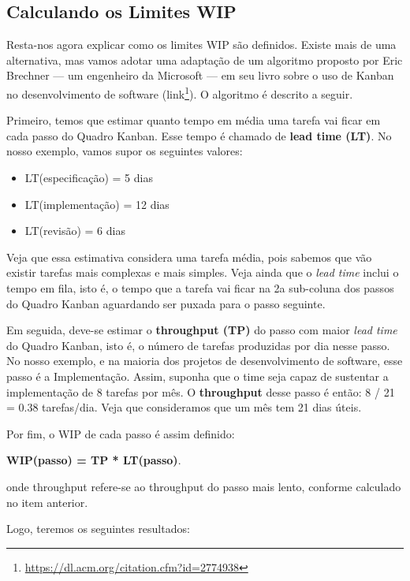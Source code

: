 \documentclass[
  11pt,
  twoside]{book}
\DeclareRobustCommand{\href}[2]{#2\footnote{\url{#1}}}
\begin{document}
\hypertarget{calculando-os-limites-wip}{%
\subsection{Calculando os Limites WIP}\label{calculando-os-limites-wip}}

  Resta-nos agora
explicar como os limites WIP são definidos. Existe mais de uma
alternativa, mas vamos adotar uma adaptação de um algoritmo proposto por
Eric Brechner --- um engenheiro da Microsoft --- em seu livro sobre o
uso de Kanban no desenvolvimento de software
(\href{https://dl.acm.org/citation.cfm?id=2774938}{link}). O algoritmo é
descrito a seguir.

Primeiro, temos que estimar quanto tempo em média uma tarefa vai ficar
em cada passo do Quadro Kanban. Esse tempo é chamado de \textbf{lead
time (LT)}. No nosso exemplo, vamos supor os seguintes valores:

\begin{itemize}
\item
  LT(especificação) = 5 dias
\item
  LT(implementação) = 12 dias
\item
  LT(revisão) = 6 dias
\end{itemize}

Veja que essa estimativa considera uma tarefa média, pois sabemos que
vão existir tarefas mais complexas e mais simples. Veja ainda que o
\emph{lead time} inclui o tempo em fila, isto é, o tempo que a tarefa
vai ficar na 2a sub-coluna dos passos do Quadro Kanban aguardando ser
puxada para o passo seguinte.

Em seguida, deve-se estimar o \textbf{throughput (TP)} do passo com
maior \emph{lead time} do Quadro Kanban, isto é, o número de tarefas
produzidas por dia nesse passo. No nosso exemplo, e na maioria dos
projetos de desenvolvimento de software, esse passo é a Implementação.
Assim, suponha que o time seja capaz de sustentar a implementação de 8
tarefas por mês. O \textbf{throughput} desse passo é então: 8 / 21 =
0.38 tarefas/dia. Veja que consideramos que um mês tem 21 dias úteis.

Por fim, o WIP de cada passo é assim definido:

\textbf{WIP(passo) = TP * LT(passo)}.

onde throughput refere-se ao throughput do passo mais lento, conforme
calculado no item anterior.

Logo, teremos os seguintes resultados:
\end{document}
